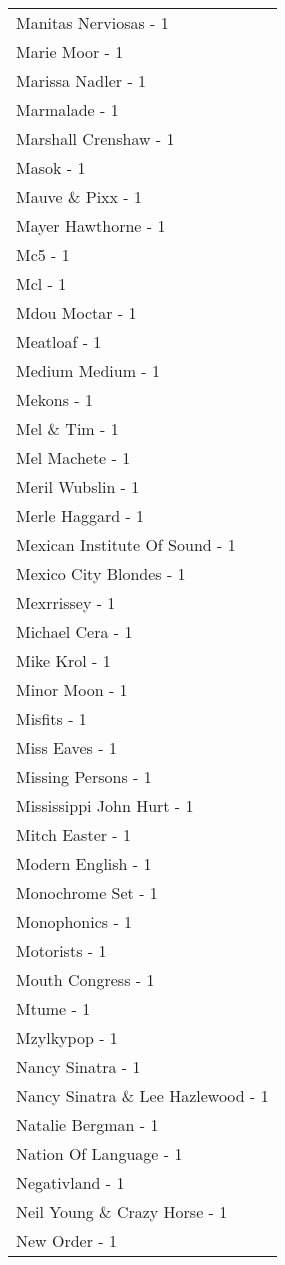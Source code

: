 \documentclass[
]{article}
\begin{document}
\begin{longtable}{l}
Manitas Nerviosas - 1 \\ 
Marie Moor - 1 \\ 
Marissa Nadler - 1 \\ 
Marmalade - 1 \\ 
Marshall Crenshaw - 1 \\ 
Masok - 1 \\ 
Mauve \& Pixx - 1 \\ 
Mayer Hawthorne - 1 \\ 
Mc5 - 1 \\ 
Mcl - 1 \\ 
Mdou Moctar - 1 \\ 
Meatloaf - 1 \\ 
Medium Medium - 1 \\ 
Mekons - 1 \\ 
Mel \& Tim - 1 \\ 
Mel Machete - 1 \\ 
Meril Wubslin - 1 \\ 
Merle Haggard - 1 \\ 
Mexican Institute Of Sound - 1 \\ 
Mexico City Blondes - 1 \\ 
Mexrrissey - 1 \\ 
Michael Cera - 1 \\ 
Mike Krol - 1 \\ 
Minor Moon - 1 \\ 
Misfits - 1 \\ 
Miss Eaves - 1 \\ 
Missing Persons - 1 \\ 
Mississippi John Hurt - 1 \\ 
Mitch Easter - 1 \\ 
Modern English - 1 \\ 
Monochrome Set - 1 \\ 
Monophonics - 1 \\ 
Motorists - 1 \\ 
Mouth Congress - 1 \\ 
Mtume - 1 \\ 
Mzylkypop - 1 \\ 
Nancy Sinatra - 1 \\ 
Nancy Sinatra \& Lee Hazlewood - 1 \\ 
Natalie Bergman - 1 \\ 
Nation Of Language - 1 \\ 
Negativland - 1 \\ 
Neil Young \& Crazy Horse - 1 \\ 
New Order - 1 \\ 

\end{longtable}
\end{document}
